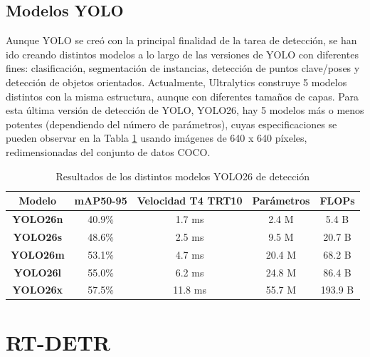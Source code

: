 \documentclass[12pt,a4paper,onecolumn,oneside]{report}
\begin{document}
\subsection{Modelos YOLO}

Aunque YOLO se creó con la principal finalidad de la tarea de detección, se han ido creando distintos modelos a lo largo de las versiones de YOLO con diferentes fines: clasificación, segmentación de instancias, detección de puntos clave/poses y detección de objetos orientados. Actualmente, Ultralytics construye 5 modelos distintos con la misma estructura, aunque con diferentes tamaños de capas. Para esta última versión de detección de YOLO, YOLO26, hay 5 modelos más o menos potentes (dependiendo del número de parámetros), cuyas especificaciones se pueden observar en la Tabla \ref{tab:yolo-models} usando imágenes de 640 x 640 píxeles, redimensionadas del conjunto de datos COCO.

\begin{table}[htb]
    \centering
    \begin{tabular}{|c|c|c|c|c|}
        \hline
        \textbf{Modelo} & \textbf{mAP}\textbf{50-95} & \textbf{Velocidad T4 TRT10} & \textbf{Parámetros} & \textbf{FLOPs}\\
        \hline
        \textbf{YOLO26n} & 40.9\% & 1.7 ms & 2.4 M & 5.4 B\\
        \hline
        \textbf{YOLO26s} & 48.6\% & 2.5 ms & 9.5 M & 20.7 B\\
        \hline
        \textbf{YOLO26m} & 53.1\% & 4.7 ms & 20.4 M & 68.2 B\\
        \hline
        \textbf{YOLO26l} & 55.0\% & 6.2 ms & 24.8 M & 86.4 B\\
        \hline
        \textbf{YOLO26x} & 57.5\% & 11.8 ms & 55.7 M & 193.9 B\\
        \hline
    \end{tabular}
    \caption{Resultados de los distintos modelos YOLO26 de detección}
    \label{tab:yolo-models}
\end{table}



\section{RT-DETR}
\end{document}
